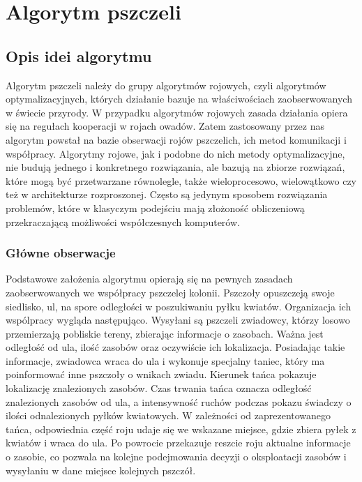 \documentclass[a4paper,12pt,notitlepage]{mwrep}
\begin{document}
\chapter{Algorytm pszczeli}
\section{Opis idei algorytmu}
Algorytm pszczeli należy do grupy algorytmów rojowych, czyli algorytmów optymalizacyjnych,
których działanie bazuje na właściwościach zaobserwowanych w świecie przyrody. W przypadku
algorytmów rojowych zasada działania opiera się na regułach kooperacji w rojach owadów.
Zatem zastosowany przez nas algorytm powstał na bazie obserwacji rojów pszczelich, ich metod
komunikacji i współpracy. Algorytmy rojowe, jak i podobne do nich metody optymalizacyjne,
nie budują jednego i konkretnego rozwiązania, ale bazują na zbiorze rozwiązań, które mogą być
przetwarzane równolegle, także wieloprocesowo, wielowątkowo czy też w architekturze rozproszonej.
Często są jedynym sposobem rozwiązania problemów, które w klasyczym podejściu mają złożoność obliczeniową
przekraczającą możliwości współczesnych komputerów.


\subsection{Główne obserwacje}
Podstawowe założenia algorytmu opierają się na pewnych zasadach zaobserwowanych we współpracy pszczelej kolonii.
Pszczoły opuszczeją swoje siedlisko, ul, na spore odległości w poszukiwaniu pyłku kwiatów.
Organizacja ich wspólpracy wygląda następująco. Wysyłani są pszczeli zwiadowcy, którzy losowo przemierzają pobliskie tereny,
zbierając informacje o zasobach. Ważna jest odległość od ula, ilość zasobów oraz oczywiście ich lokalizacja. Posiadając takie
informacje, zwiadowca wraca do ula i wykonuje specjalny taniec, który ma poinformować inne pszczoły o wnikach zwiadu.
Kierunek tańca pokazuje lokalizację znalezionych zasobów. Czas trwania tańca oznacza odległość znalezionych zasobów
od ula, a intensywność ruchów podczas pokazu świadczy o ilości odnalezionych pyłków kwiatowych. W zależności od zaprezentowanego
tańca, odpowiednia część roju udaje się we wskazane miejsce, gdzie zbiera pyłek z kwiatów i wraca do ula. Po powrocie przekazuje
reszcie roju aktualne informacje o zasobie, co pozwala na kolejne podejmowania decyzji o oksploatacji zasobów i wysyłaniu w dane
miejsce kolejnych pszczół.
\end{document}
